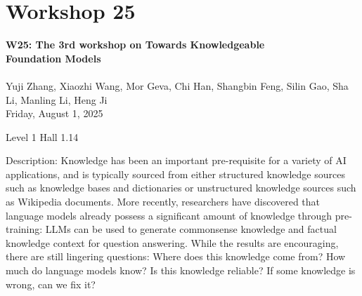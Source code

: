 \clearpage


\section[W25: The 3rd workshop on Towards Knowledgeable Foundation Models]{Workshop 25}
\label{workshop_25}

\begin{center}
    {\Large \textbf{W25: The 3rd workshop on Towards Knowledgeable \\
    Foundation Models}}\\
\\

Yuji Zhang, Xiaozhi Wang, Mor Geva, Chi Han, Shangbin Feng, Silin Gao, Sha Li, Manling Li, Heng Ji\\

    Friday, August 1, 2025

 Level 1 Hall 1.14
    
\end{center}

Description: Knowledge has been an important pre-requisite for a variety of AI applications, and is typically sourced from either structured knowledge sources such as knowledge bases and dictionaries or unstructured knowledge sources such as Wikipedia documents. More recently, researchers have discovered that language models already possess a significant amount of knowledge through pre-training: LLMs can be used to generate commonsense knowledge and factual knowledge context for question answering. While the results are encouraging, there are still lingering questions: Where does this knowledge come from? How much do language models know? Is this knowledge reliable? If some knowledge is wrong, can we fix it?

